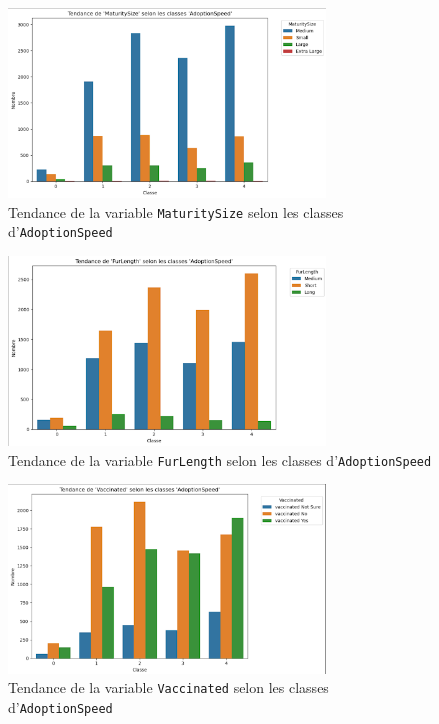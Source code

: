 \documentclass[a4paper,12pt]{article}
\begin{document}
\begin{figure}[H]
    \centering
    \includegraphics[width=0.75\textwidth]{maturitysize_adoption_trend.png}
    \caption{Tendance de la variable \texttt{MaturitySize} selon les classes d'\texttt{AdoptionSpeed}}
    \label{fig:maturitysize_trend}
\end{figure}

\begin{figure}[H]
    \centering
    \includegraphics[width=0.75\textwidth]{furlength_adoption_trend.png}
    \caption{Tendance de la variable \texttt{FurLength} selon les classes d'\texttt{AdoptionSpeed}}
    \label{fig:furlength_trend}
\end{figure}

\begin{figure}[H]
    \centering
    \includegraphics[width=0.75\textwidth]{vaccinated_adoption_trend.png}
    \caption{Tendance de la variable \texttt{Vaccinated} selon les classes d'\texttt{AdoptionSpeed}}
    \label{fig:vaccinated_trend}
\end{figure}
\end{document}
